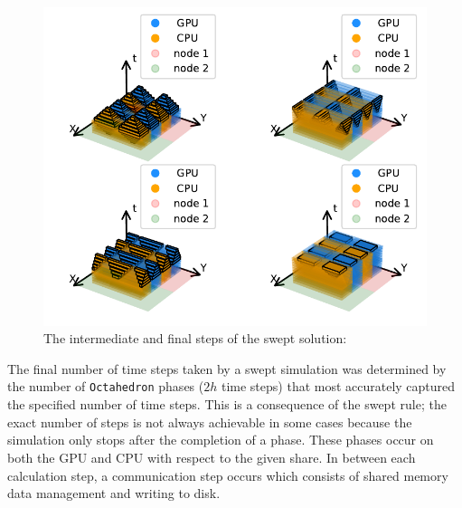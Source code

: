 \documentclass[preprints,article,accept,moreauthors,pdftex]{Definitions/mdpi}
\def\Down{\texttt{Down-Pyramid}}
\def\Oct{\texttt{Octahedron}}
\def\Xb{\texttt{X-Bridge}}
\def\Yb{\texttt{Y-Bridge}}
\newcommand\fs{0.7}
\begin{document}
\begin{figure}[H]
    
    \begin{center}
        \includegraphics[scale=\fs, trim={1cm 0.6cm 0.5cm 0cm},clip]{figs/SubsPlot2.pdf}
    \end{center}
    \caption{The intermediate and final steps of the swept solution: }
    \label{fig:MainTwo}
\end{figure}







\par
The final number of time steps taken by a swept simulation was determined by the number of \Oct{} phases ($2h$ time steps) that most accurately captured the specified number of time steps. This is a consequence of the swept rule; the exact number of steps is not always achievable in some cases because the simulation only stops after the completion of a phase. These phases occur on both the GPU and CPU with respect to the given share. In between each calculation step, a communication step occurs which consists of shared memory data management and writing to disk.
\end{document}
